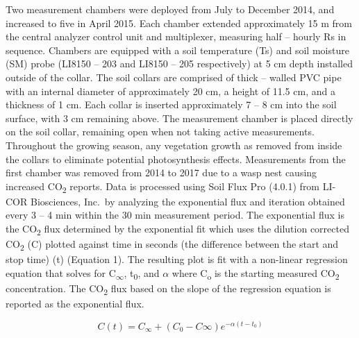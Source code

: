 \documentclass[]{elsarticle} %
\begin{document}
Two measurement chambers were deployed from July to December 2014, and
increased to five in April 2015. Each chamber extended approximately 15
m from the central analyzer control unit and multiplexer, measuring half
-- hourly Rs in sequence. Chambers are equipped with a soil temperature
(Ts) and soil moisture (SM) probe (LI8150 -- 203 and LI8150 -- 205
respectively) at 5 cm depth installed outside of the collar. \newline
\newline The soil collars are comprised of thick -- walled PVC pipe with
an internal diameter of approximately 20 cm, a height of 11.5 cm, and a
thickness of 1 cm. Each collar is inserted approximately 7 -- 8 cm into
the soil surface, with 3 cm remaining above. The measurement chamber is
placed directly on the soil collar, remaining open when not taking
active measurements. Throughout the growing season, any vegetation
growth as removed from inside the collars to eliminate potential
photosynthesis effects. \newline \newline Measurements from the first
chamber was removed from 2014 to 2017 due to a wasp nest causing
increased CO\textsubscript{2} reports. Data is processed using Soil Flux
Pro (4.0.1) from LI-COR Biosciences, Inc.~by analyzing the exponential
flux and iteration obtained every 3 -- 4 min within the 30 min
measurement period. The exponential flux is the CO\textsubscript{2} flux
determined by the exponential fit which uses the dilution corrected
CO\textsubscript{2} (C) plotted against time in seconds (the difference
between the start and stop time) (t) (Equation 1). The resulting plot is
fit with a non-linear regression equation that solves for
C\textsubscript{\(\infty\)}, t\textsubscript{0}, and \(\alpha\) where
C\textsubscript{o} is the starting measured CO\textsubscript{2}
concentration. The CO\textsubscript{2} flux based on the slope of the
regression equation is reported as the exponential flux.

\[ C(t) = C_\infty + (C_0 - C\infty)e^{-\alpha(t-t_0)} \]
\end{document}
